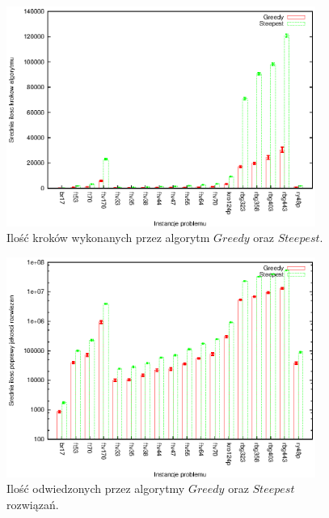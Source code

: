 \begin{figure}
\begin{center}
\includegraphics[width=0.9\textwidth]{wykresy/steepest_greedy_steps}
\end{center}
\caption{Ilość kroków wykonanych przez algorytm $Greedy$ oraz $Steepest$.}
\label{steepest_greedy_steps}
\end{figure}

\begin{figure}
\begin{center}
\includegraphics[width=0.9\textwidth]{wykresy/steepest_greedy_visits}
\end{center}
\caption{Ilość odwiedzonych przez algorytmy $Greedy$ oraz $Steepest$
rozwiązań.}
\label{steepest_greedy_visits}
\end{figure}


